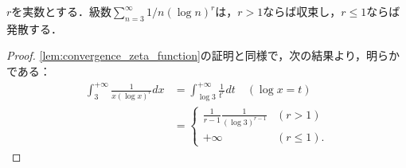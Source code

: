 \documentclass[a4paper,10pt]{ltjsarticle}
\begin{document}
\begin{MyLemma}
  \(r\)を実数とする．級数\(\sum_{n=3}^\infty 1/n(\log n)^r\)は，\(r > 1\)ならば収束し，\(r \le 1\)ならば発散する．
\end{MyLemma}
\begin{proof}
  \cref{lem:convergence_zeta_function}の証明と同様で，次の結果より，明らかである：
  \begin{align*}
    \int_{3}^{+\infty} \frac1{x(\log x)^r}dx & = \int_{\log 3}^{+\infty} \frac1{t^r}dt \quad (\log x = t)                            \\
                                             & = \begin{cases}
                                                   \frac1{r - 1} \frac1{(\log 3)^{r-1}} & (r > 1)    \\
                                                   +\infty                              & (r \le 1).
                                                 \end{cases}
  \end{align*}
\end{proof}
\end{document}
